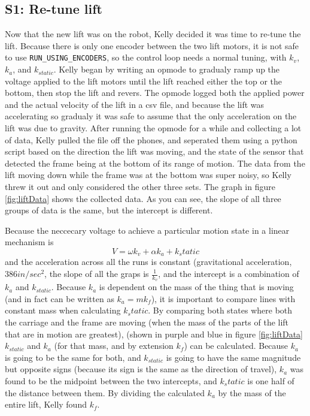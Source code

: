 \documentclass{article}
\begin{document}
\subsection{S1: Re-tune lift}

Now that the new lift was on the robot, Kelly decided it was time to re-tune the lift. Because there is only one encoder between the two lift motors, it is not safe to use \texttt{RUN\_USING\_ENCODERS}, so the control loop needs a normal tuning, with $k_v$, $k_a$, and $k_{static}$. Kelly began by writing an opmode to gradualy ramp up the voltage applied to the lift motors until the lift reached either the top or the bottom, then stop the lift and revers. The opmode logged both the applied power and the actual velocity of the lift in a csv file, and because the lift was accelerating so gradualy it was safe to assume that the only acceleration on the lift was due to gravity. After running the opmode for a while and collecting a lot of data, Kelly pulled the file off the phones, and seperated them using a python script based on the direction the lift was moving, and the state of the sensor that detected the frame being at the bottom of its range of motion. The data from the lift moving down while the frame was at the bottom was super noisy, so Kelly threw it out and only considered the other three sets. The graph in figure \ref{fig:liftData} shows the collected data. As you can see, the slope of all three groups of data is the same, but the intercept is different. 

Because the neccecary voltage to achieve a particular motion state in a linear mechanism is $$V = \omega k_v + \alpha k_a + k_static$$ 
and the acceleration across all the runs is constant (gravitational acceleration, $386 in/sec^2$, the slope of all the graps is $\frac{1}{k_v}$, and the intercept is a combination of $k_a$ and $k_{static}$. Because $k_a$ is dependent on the mass of the thing that is moving (and in fact can be written as $k_a = m k_f$), it is important to compare lines with constant mass when calculating $k_static$. By comparing both states where both the carriage and the frame are moving (when the mass of the parts of the lift that are in motion are greatest), (shown in purple and blue in figure \ref{fig:liftData} $k_{static}$ and $k_a$ (for that mass, and by extension $k_f$) can be calculated. Because $k_a$ is going to be the same for both, and $k_{static}$ is going to have the same magnitude but opposite signs (because its sign is the same as the direction of travel), $k_a$ was found to be the midpoint between the two intercepts, and $k_static$ is one half of the distance between them. By dividing the calculated $k_a$ by the mass of the entire lift, Kelly found $k_f$. 
\end{document}

